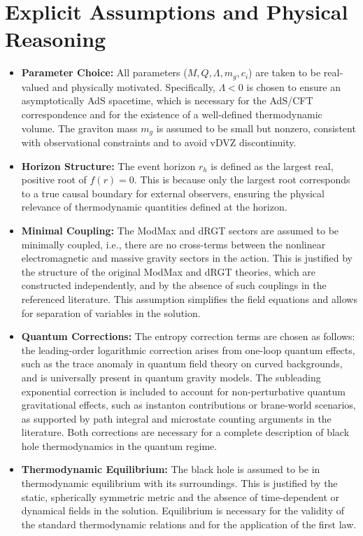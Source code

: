 \documentclass[12pt]{article}
\begin{document}
\section{Explicit Assumptions and Physical Reasoning}
\begin{itemize}
    \item \textbf{Parameter Choice:} All parameters ($M, Q, \Lambda, m_g, c_i$) are taken to be real-valued and physically motivated. Specifically, $\Lambda < 0$ is chosen to ensure an asymptotically AdS spacetime, which is necessary for the AdS/CFT correspondence and for the existence of a well-defined thermodynamic volume. The graviton mass $m_g$ is assumed to be small but nonzero, consistent with observational constraints and to avoid vDVZ discontinuity.
    \item \textbf{Horizon Structure:} The event horizon $r_h$ is defined as the largest real, positive root of $f(r) = 0$. This is because only the largest root corresponds to a true causal boundary for external observers, ensuring the physical relevance of thermodynamic quantities defined at the horizon.
    \item \textbf{Minimal Coupling:} The ModMax and dRGT sectors are assumed to be minimally coupled, i.e., there are no cross-terms between the nonlinear electromagnetic and massive gravity sectors in the action. This is justified by the structure of the original ModMax and dRGT theories, which are constructed independently, and by the absence of such couplings in the referenced literature. This assumption simplifies the field equations and allows for separation of variables in the solution.
    \item \textbf{Quantum Corrections:} The entropy correction terms are chosen as follows: the leading-order logarithmic correction arises from one-loop quantum effects, such as the trace anomaly in quantum field theory on curved backgrounds, and is universally present in quantum gravity models. The subleading exponential correction is included to account for non-perturbative quantum gravitational effects, such as instanton contributions or brane-world scenarios, as supported by path integral and microstate counting arguments in the literature. Both corrections are necessary for a complete description of black hole thermodynamics in the quantum regime.
    \item \textbf{Thermodynamic Equilibrium:} The black hole is assumed to be in thermodynamic equilibrium with its surroundings. This is justified by the static, spherically symmetric metric and the absence of time-dependent or dynamical fields in the solution. Equilibrium is necessary for the validity of the standard thermodynamic relations and for the application of the first law.

\end{itemize}
\end{document}
